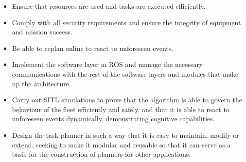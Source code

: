 \begin{itemize}
    \item Ensure that resources are used and tasks are executed efficiently.
    \item Comply with all security requirements and ensure the integrity of equipment and mission success.
    \item Be able to replan online to react to unforeseen events.
    \item Implement the software layer in \gls{ROS} and manage the necessary communications with the rest of the software layers and modules that make up the architecture.
    \item Carry out \gls{SITL} simulations to prove that the algorithm is able to govern the behaviour of the fleet efficiently and safely, and that it is able to react to unforeseen events dynamically, demonstrating cognitive capabilities.
    \item Design the task planner in such a way that it is easy to maintain, modify or extend, seeking to make it modular and reusable so that it can serve as a basis for the construction of planners for other applications.
\end{itemize}



\endinput